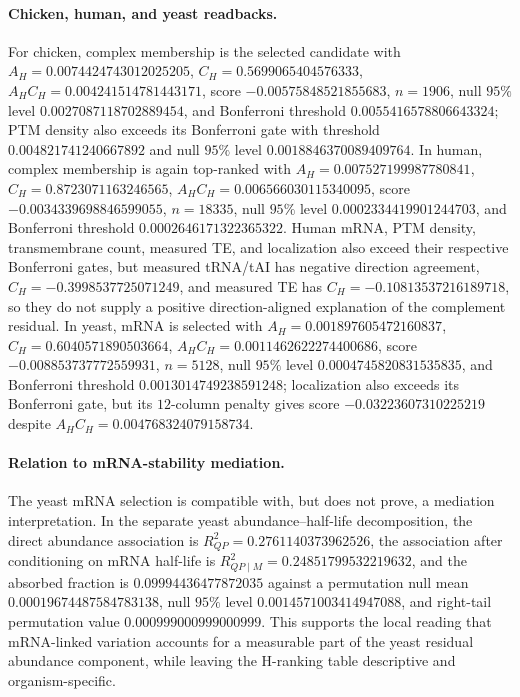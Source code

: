 \paragraph{Chicken, human, and yeast readbacks.}
For chicken, complex membership is the selected candidate with $A_H=0.0074424743012025205$, $C_H=0.5699065404576333$, $A_HC_H=0.004241514781443171$, score $-0.00575848521855683$, $n=1906$, null $95\%$ level $0.0027087118702889454$, and Bonferroni threshold $0.0055416578806643324$; PTM density also exceeds its Bonferroni gate with threshold $0.004821741240667892$ and null $95\%$ level $0.0018846370089409764$.  In human, complex membership is again top-ranked with $A_H=0.007527199987780841$, $C_H=0.8723071163246565$, $A_HC_H=0.006566030115340095$, score $-0.0034339698846599055$, $n=18335$, null $95\%$ level $0.0002334419901244703$, and Bonferroni threshold $0.0002646171322365322$.  Human mRNA, PTM density, transmembrane count, measured TE, and localization also exceed their respective Bonferroni gates, but measured tRNA/tAI has negative direction agreement, $C_H=-0.3998537725071249$, and measured TE has $C_H=-0.10813537216189718$, so they do not supply a positive direction-aligned explanation of the complement residual.  In yeast, mRNA is selected with $A_H=0.001897605472160837$, $C_H=0.6040571890503664$, $A_HC_H=0.0011462622274400686$, score $-0.008853737772559931$, $n=5128$, null $95\%$ level $0.0004745820831535835$, and Bonferroni threshold $0.0013014749238591248$; localization also exceeds its Bonferroni gate, but its $12$-column penalty gives score $-0.03223607310225219$ despite $A_HC_H=0.004768324079158734$.

\paragraph{Relation to mRNA-stability mediation.}
The yeast mRNA selection is compatible with, but does not prove, a mediation interpretation.  In the separate yeast abundance--half-life decomposition, the direct abundance association is $R^2_{QP}=0.2761140373962526$, the association after conditioning on mRNA half-life is $R^2_{QP\mid M}=0.24851799532219632$, and the absorbed fraction is $0.09994436477872035$ against a permutation null mean $0.00019674487584783138$, null $95\%$ level $0.0014571003414947088$, and right-tail permutation value $0.000999000999000999$.  This supports the local reading that mRNA-linked variation accounts for a measurable part of the yeast residual abundance component, while leaving the H-ranking table descriptive and organism-specific.

